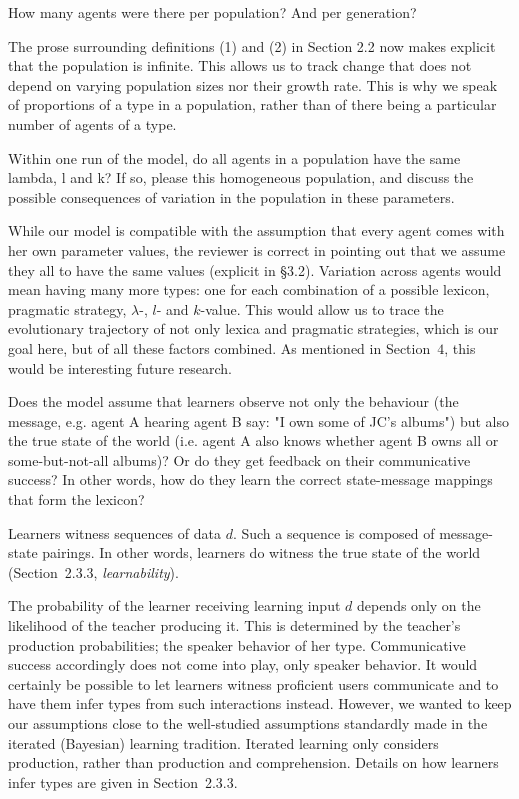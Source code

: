 \documentclass[12pt,a4paper]{article}
\begin{document}
\vspace{.5cm}
\begin{mdframed}[backgroundcolor=gray!25,linecolor=gray!25]
 How many agents were there per population? And per generation?
\end{mdframed}
The prose surrounding definitions (1) and (2) in Section 2.2 now makes explicit that the population is infinite. This allows us to track change that does not depend on varying population sizes nor their growth rate. This is why we speak of proportions of a type in a population, rather than of there being a particular number of agents of a type. 

\vspace{.5cm}
  \begin{mdframed}[backgroundcolor=gray!25,linecolor=gray!25]
Within one run of the model, do all agents in a population have the same lambda, l and k? If so, please this homogeneous population, and discuss the possible consequences of variation in the population in these parameters.
\end{mdframed}
While our model is compatible with the assumption that every agent comes with her own parameter values, the reviewer is correct in pointing out that we assume they all to have the same values (explicit in \S3.2). Variation across agents would mean having many more types: one for each combination of a possible lexicon, pragmatic strategy, $\lambda$-, $l$- and $k$-value. This would allow us to trace the evolutionary trajectory of not only lexica and pragmatic strategies, which is our goal here, but of all these factors combined. As mentioned in Section~$4$, this would be interesting future research.

\vspace{.5cm}
\begin{mdframed}[backgroundcolor=gray!25,linecolor=gray!25]
Does the model assume that learners observe not only the behaviour (the message, e.g. agent A hearing agent B say: "I own some of JC's albums") but also the true state of the world (i.e. agent A also knows whether agent B owns all or some-but-not-all albums)? Or do they get feedback on their communicative success? In other words, how do they learn the correct state-message mappings that form the lexicon? 
\end{mdframed}
Learners witness sequences of data $d$. Such a sequence is composed of message-state pairings. In other words, learners do witness the true state of the world (Section~2.3.3, {\em learnability}).

The probability of the learner receiving learning input $d$ depends only on the likelihood of the teacher producing it. This is determined by the teacher's production probabilities; the speaker behavior of her type. Communicative success accordingly does not come into play, only speaker behavior. It would certainly be possible to let learners witness proficient users communicate and to have them infer types from such interactions instead. However, we wanted to keep our assumptions close to the well-studied assumptions standardly made in the iterated (Bayesian) learning tradition. Iterated learning only considers production, rather than production and comprehension. Details on how learners infer types are given in Section~2.3.3.
\end{document}
